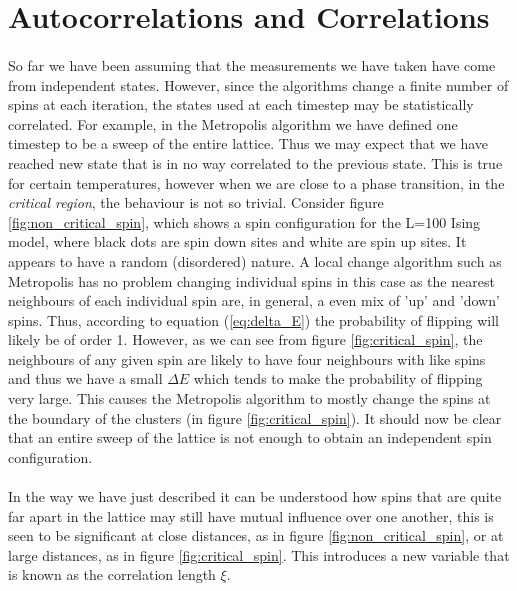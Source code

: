 \documentclass[12pt] {report} %
\begin{document}
		\section{Autocorrelations and Correlations}  \label{sec:autocorrelation}
		
			\paragraph{}
				So far we have been assuming that the measurements we have taken have come from independent states. However, since the algorithms change a finite number of spins at each iteration, the states used at each timestep may be statistically correlated. For example, in the Metropolis algorithm we have defined one timestep to be a sweep of the entire lattice. Thus we may expect that we have reached new state that is in no way correlated to the previous state. This is true for certain temperatures, however when we are close to a phase transition, in the \textit{critical region}, the behaviour is not so trivial. Consider figure \ref{fig:non_critical_spin}, which shows a spin configuration for the L=100 Ising model, where black dots are spin down sites and white are spin up sites. It appears to have a random (disordered) nature. A local change algorithm such as Metropolis has no problem changing individual spins in this case as the nearest neighbours of each individual spin are, in general, a even mix of 'up' and 'down' spins. Thus, according to equation (\ref{eq:delta_E}) the probability of flipping will likely be of order 1. However, as we can see from figure \ref{fig:critical_spin}, the neighbours of any given spin are likely to have four neighbours with like spins and thus we have a small $\Delta E$ which tends to make the probability of flipping very large. This causes the Metropolis algorithm to mostly change the spins at the boundary of the clusters (in figure \ref{fig:critical_spin}). It should now be clear that an entire sweep of the lattice is not enough to obtain an independent spin configuration.
				
			\paragraph{}
				In the way we have just described it can be understood how spins that are quite far apart in the lattice may still have mutual influence over one another, this is seen to be significant at close distances, as in figure \ref{fig:non_critical_spin}, or at large distances, as in figure \ref{fig:critical_spin}. This introduces a new variable that is known as the correlation length $\xi$.
				
\end{document}
